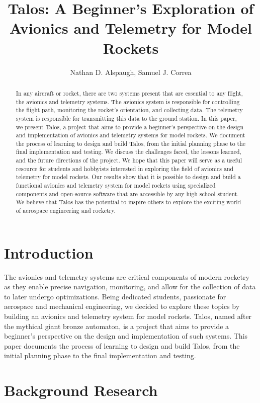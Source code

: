 \documentclass{article}
\title{Talos: A Beginner's Exploration of Avionics and Telemetry for Model Rockets}
\author{Nathan D. Alspaugh, Samuel J. Correa}
\begin{document}
\maketitle

\begin{abstract}
      In any aircraft or rocket, there are two systems present that are essential to any flight, the avionics and telemetry systems. The avionics system is responsible for controlling the flight path, monitoring the rocket's orientation, and collecting data. The telemetry system is responsible for transmitting this data to the ground station. In this paper, we present Talos, a project that aims to provide a beginner's perspective on the design and implementation of avionics and telemetry systems for model rockets. We document the process of learning to design and build Talos, from the initial planning phase to the final implementation and testing. We discuss the challenges faced, the lessons learned, and the future directions of the project. We hope that this paper will serve as a useful resource for students and hobbyists interested in exploring the field of avionics and telemetry for model rockets. Our results show that it is possible to design and build a functional avionics and telemetry system for model rockets using specialized components and open-source software that are accessible by any high school student. We believe that Talos has the potential to inspire others to explore the exciting world of aerospace engineering and rocketry.
\end{abstract}

\section{Introduction}

The avionics and telemetry systems are critical components of modern rocketry as they enable precise navigation, monitoring, and allow for the collection of data to later undergo optimizations. Being dedicated students, passionate for aerospace and mechanical engineering, we decided to explore these topics by building an avionics and telemetry system for model rockets. Talos, named after the mythical giant bronze automaton, is a project that aims to provide a beginner's perspective on the design and implementation of such systems. This paper documents the process of learning to design and build Talos, from the initial planning phase to the final implementation and testing.

\section{Background Research}
\end{document}
